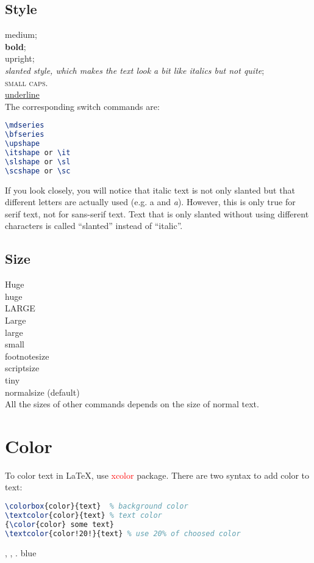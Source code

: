 \subsection{Style}
\textmd{medium};    \\
\textbf{bold}; \\
\textup{upright};   \\
\textsl{slanted style, which makes the text look a bit like \textit{italics}
but not quite}; \\
\textsc{small caps}. \\
\underline{underline}	\\
The corresponding switch commands are:
\begin{lstlisting}[language=TeX]
\mdseries
\bfseries
\upshape 
\itshape or \it
\slshape or \sl
\scshape or \sc
\end{lstlisting}
If you look closely, you will notice that italic text is not only slanted
but that different letters are actually used (e.g. a and {\it a}). 
However, this is only true for serif text, not for sans-serif text. Text
that is only slanted without using different characters is called 
``slanted'' instead of ``italic''.

\subsection{Size}
{\Huge Huge} \\
{\huge huge} \\
{\LARGE LARGE}	\\
{\Large Large}	\\
{\large large}	\\
{\small small}	\\
{\footnotesize footnotesize} \\
{\scriptsize scriptsize}	\\
{\tiny tiny} \\
{\normalsize normalsize (default)}    \\
All the sizes of other commands depends on the size of normal text.


\section{Color}
To color text in \LaTeX{}, use \textcolor{red}{xcolor} package. There are 
two syntax to add color to text:
\begin{lstlisting}[language=TeX]
\colorbox{color}{text}	% background color
\textcolor{color}{text}	% text color
{\color{color} some text}
\textcolor{color!20!}{text}	% use 20% of choosed color
\end{lstlisting}
, , .
\colorbox{blue!30}{blue}

